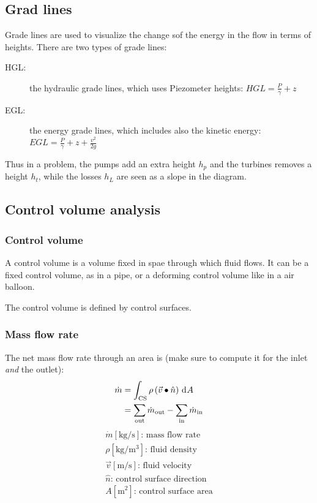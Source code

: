 \documentclass[10pt, twocolumn]{article}
\begin{document}
\subsection{Grad lines}
Grade lines are used to visualize the change sof the energy in the flow in terms of heights.
There are two types of grade lines:
\begin{description}
  \item[HGL:] the hydraulic grade lines, which uses Piezometer heights: \(HGL = \frac{P}{\gamma} + z\)
  \item[EGL:] the energy grade lines, which includes also the kinetic energy: \(EGL = \frac{P}{\gamma} + z + \frac{v^2}{2g}\)
\end{description}

Thus in a problem, the pumps add an extra height \(h_p\) and the turbines removes a height \(h_t\), while the losses \(h_L\) are seen as a slope in the diagram.


\subsection{Control volume analysis}
\subsubsection{Control volume}
A control volume is a volume fixed in spae through which fluid flows.
It can be a fixed control volume, as in a pipe, or a deforming control volume like in a air balloon.

The control volume is defined by control surfaces.

\subsubsection{Mass flow rate}
The net mass flow rate through an area is (make sure to compute it for the inlet \emph{and} the outlet):
\begin{align*}
  \dot{m} & = \int_\mathrm{CS}{\rho \left( \vec{v} \bullet \hat{n} \right) \,\mathrm{d}^{} A}       \\
          & = \sum_\mathrm{out}{\dot{m}_\mathrm{out}} - \sum_\mathrm{in}{\dot{m}_\mathrm{in}}
\end{align*}
\[
  \begin{array}{|l}
    \dot{m} [\si{\kilogram\per\second}] \text{: mass flow rate}  \\
    \rho [\si{\kilogram\per\metre\cubed}] \text{: fluid density} \\
    \vec{v} [\si{\metre\per\second}] \text{: fluid velocity}     \\
    \hat{n} \text{: control surface direction}                   \\
    A [\si{\metre\squared}] \text{: control surface area}        \\
  \end{array}
\]
\end{document}
